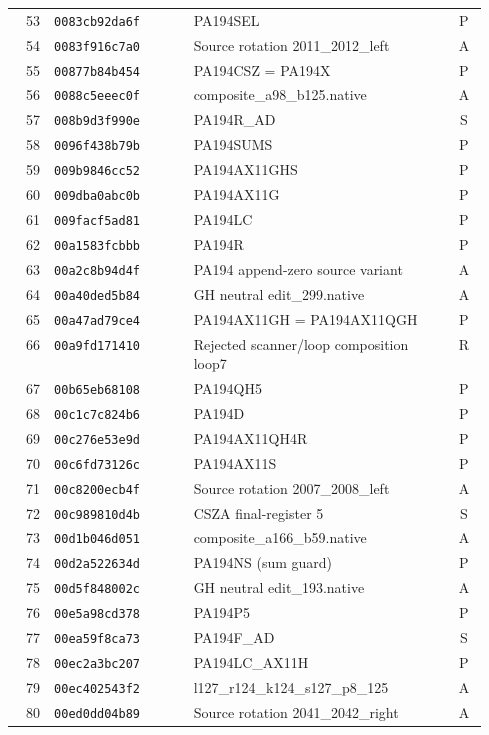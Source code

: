 \begin{longtable}{@{}r l p{0.55\linewidth} c@{}}
53 & \texttt{0083cb92da6f} & PA194SEL & P \\
54 & \texttt{0083f916c7a0} & Source rotation 2011\_2012\_left & A \\
55 & \texttt{00877b84b454} & PA194CSZ = PA194X & P \\
56 & \texttt{0088c5eeec0f} & composite\_a98\_b125.native & A \\
57 & \texttt{008b9d3f990e} & PA194R\_AD & S \\
58 & \texttt{0096f438b79b} & PA194SUMS & P \\
59 & \texttt{009b9846cc52} & PA194AX11GHS & P \\
60 & \texttt{009dba0abc0b} & PA194AX11G & P \\
61 & \texttt{009facf5ad81} & PA194LC & P \\
62 & \texttt{00a1583fcbbb} & PA194R & P \\
63 & \texttt{00a2c8b94d4f} & PA194 append-zero source variant & A \\
64 & \texttt{00a40ded5b84} & GH neutral edit\_299.native & A \\
65 & \texttt{00a47ad79ce4} & PA194AX11GH = PA194AX11QGH & P \\
66 & \texttt{00a9fd171410} & Rejected scanner/loop composition loop7 & R \\
67 & \texttt{00b65eb68108} & PA194QH5 & P \\
68 & \texttt{00c1c7c824b6} & PA194D & P \\
69 & \texttt{00c276e53e9d} & PA194AX11QH4R & P \\
70 & \texttt{00c6fd73126c} & PA194AX11S & P \\
71 & \texttt{00c8200ecb4f} & Source rotation 2007\_2008\_left & A \\
72 & \texttt{00c989810d4b} & CSZA final-register 5 & S \\
73 & \texttt{00d1b046d051} & composite\_a166\_b59.native & A \\
74 & \texttt{00d2a522634d} & PA194NS (sum guard) & P \\
75 & \texttt{00d5f848002c} & GH neutral edit\_193.native & A \\
76 & \texttt{00e5a98cd378} & PA194P5 & P \\
77 & \texttt{00ea59f8ca73} & PA194F\_AD & S \\
78 & \texttt{00ec2a3bc207} & PA194LC\_AX11H & P \\
79 & \texttt{00ec402543f2} & l127\_r124\_k124\_s127\_p8\_125 & A \\
80 & \texttt{00ed0dd04b89} & Source rotation 2041\_2042\_right & A \\

\end{longtable}
